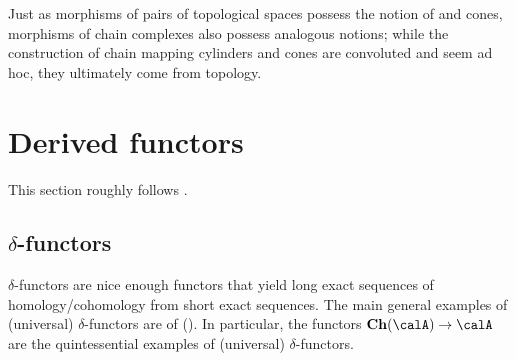 Just as morphisms of pairs of topological spaces possess the notion of  and cones, morphisms of chain complexes also possess analogous notions; while the construction of chain mapping cylinders and cones are convoluted and seem ad hoc, they ultimately come from topology. 








\section{Derived functors}

This section roughly follows \cite[Section 2]{weibel}.

\subsection{$\delta$-functors}

$\delta$-functors are nice enough functors that yield long exact sequences of homology/cohomology from short exact sequences. The main general examples of (universal) $\delta$-functors are  of  (). In particular, the  functors $\mathbf{Ch}(\calA) \to \calA$ are the quintessential examples of (universal) $\delta$-functors.








